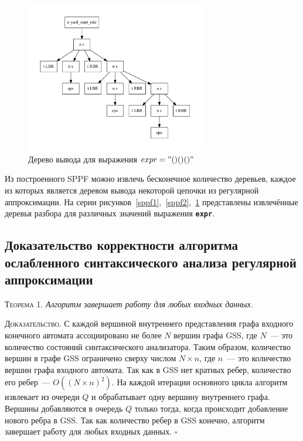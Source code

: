 \begin{figure}[!h]
    \centering
    \includegraphics[width=0.7\textwidth]{pics/sppf3.pdf}
    \caption{Дерево вывода для выражения $expr="()()()"$}
    \label{sppf3}
\end{figure}


Из построенного SPPF можно извлечь бесконечное количество деревьев, каждое из которых является деревом вывода некоторой цепочки из регулярной аппроксимации. На серии рисунков~\ref{sppf1},~\ref{sppf2},~\ref{sppf3} представлены извлечённые деревья разбора для различных значений выражения \textbf{\texttt{expr}}.  


\subsection{Доказательство корректности алгоритма ослабленного синтаксического анализа регулярной аппроксимации}

\textsc{Теорема 1.} 
\textit{Алгоритм завершает работу для любых входных данных.}

\textsc{Доказательство.}
С каждой вершиной внутреннего представления графа входного конечного автомата ассоциировано не более $N$ вершин графа GSS, где $N$~--- это количество состояний синтаксического анализатора. Таким образом, количество вершин в графе GSS ограничено сверху числом $N \times n$, где $n$~--- это количество вершин графа входного автомата. Так как в GSS нет кратных ребер, количество его ребер~--- $O((N \times n)^{2})$. На каждой итерации основного цикла алгоритм извлекает из очереди $Q$ и обрабатывает одну вершину внутреннего графа. Вершины добавляются в очередь $Q$ только тогда, когда происходит добавление нового ребра в GSS. Так как количество ребер в GSS конечно, алгоритм завершает работу для любых входных данных. $\square$

